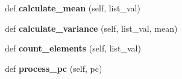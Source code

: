 \begin{DoxyCompactItemize}
def {\bfseries calculate\+\_\+mean} (self, list\+\_\+val)
\item 
\mbox{\label{classlocal__map_1_1Lidar2Image_ae073368a4c438aefbde19b76b561ce91}} 
def {\bfseries calculate\+\_\+variance} (self, list\+\_\+val, mean)
\item 
\mbox{\label{classlocal__map_1_1Lidar2Image_ac64ba8997d48b57cfac9c37b47d04784}} 
def {\bfseries count\+\_\+elements} (self, list\+\_\+val)
\item 
\mbox{\label{classlocal__map_1_1Lidar2Image_a2346ad0c8d42a344ab48cb002879d835}} 
def {\bfseries process\+\_\+pc} (self, pc)
\end{DoxyCompactItemize}
